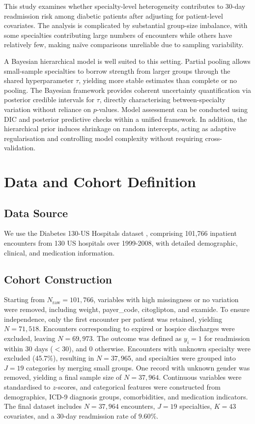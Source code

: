 \documentclass[10pt]{article}
\begin{document}
This study examines whether specialty-level heterogeneity contributes to 30-day readmission risk among diabetic patients after adjusting for patient-level covariates. The analysis is complicated by substantial group-size imbalance, with some specialties contributing large numbers of encounters while others have relatively few, making naïve comparisons unreliable due to sampling variability.

A Bayesian hierarchical model is well suited to this setting. Partial pooling allows small-sample specialties to borrow strength from larger groups through the shared hyperparameter $\tau$, yielding more stable estimates than complete or no pooling. The Bayesian framework provides coherent uncertainty quantification via posterior credible intervals for $\tau$, directly characterising between-specialty variation without reliance on $p$-values. Model assessment can be conducted using DIC and posterior predictive checks within a unified framework. In addition, the hierarchical prior induces shrinkage on random intercepts, acting as adaptive regularisation and controlling model complexity without requiring cross-validation.

\section{Data and Cohort Definition}

\subsection{Data Source}

We use the Diabetes 130-US Hospitals dataset \citep{strack2014diabetes}, comprising 101{,}766 inpatient encounters from 130 US hospitals over 1999-2008, with detailed demographic, clinical, and medication information.

\subsection{Cohort Construction}

Starting from $N_{\text{raw}} = 101{,}766$, variables with high missingness or no variation were removed, including weight, payer\_code, citoglipton, and examide. To ensure independence, only the first encounter per patient was retained, yielding $N = 71{,}518$. Encounters corresponding to expired or hospice discharges were excluded, leaving $N = 69{,}973$. The outcome was defined as $y_i = 1$ for readmission within 30 days ($<30$), and $0$ otherwise. Encounters with unknown specialty were excluded (45.7\%), resulting in $N = 37{,}965$, and specialties were grouped into $J = 19$ categories by merging small groups. One record with unknown gender was removed, yielding a final sample size of $N = 37{,}964$. Continuous variables were standardised to $z$-scores, and categorical features were constructed from demographics, ICD-9 diagnosis groups, comorbidities, and medication indicators. The final dataset includes $N = 37{,}964$ encounters, $J = 19$ specialties, $K = 43$ covariates, and a 30-day readmission rate of $9.60\%$.
\end{document}
